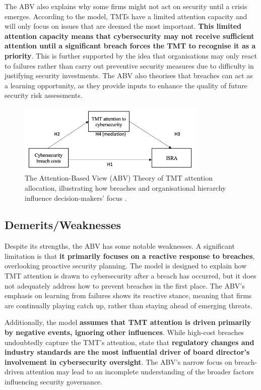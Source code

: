    The ABV also explains why some firms might not act on security until a crisis emerges. According to the model, TMTs have a limited attention capacity and will only focus on issues that are deemed the most important. \textbf{This limited attention capacity means that cybersecurity may not receive sufficient attention until a significant breach forces the TMT to recognise it as a priority}. This is further supported by the idea that organisations may only react to failures rather than carry out preventive security measures due to difficulty in justifying security investments. The ABV also theorises that breaches can act as a learning opportunity, as they provide inputs to enhance the quality of future security risk assessments.

    \begin{figure}[htbp]
        \centering
        \includegraphics[width=0.8\textwidth]{figures/ABV-Theory.png}
        \caption{The Attention-Based View (ABV) Theory of TMT attention allocation, illustrating how breaches and organisational hierarchy influence decision-makers' focus \citep{shaikh2023information}.}
        \label{fig:ABV}
    \end{figure}

    \subsection{Demerits/Weaknesses}
    Despite its strengths, the ABV has some notable weaknesses. A significant limitation is that \textbf{it primarily focuses on a reactive response to breaches}, overlooking proactive security planning. The model is designed to explain how TMT attention is drawn to cybersecurity after a breach has occurred, but it does not adequately address how to prevent breaches in the first place. The ABV's emphasis on learning from failures shows its reactive stance, meaning that firms are continually playing catch up, rather than staying ahead of emerging threats.

    Additionally, the model \textbf{assumes that TMT attention is driven primarily by negative events, ignoring other influences}. While high-cost breaches undoubtedly capture the TMT's attention, \citet{gale2022governing} state that \textbf{regulatory changes and industry standards are the most influential driver of board director's involvement in cybersecurity oversight}. The ABV's narrow focus on breach-driven attention may lead to an incomplete understanding of the broader factors influencing security governance.

